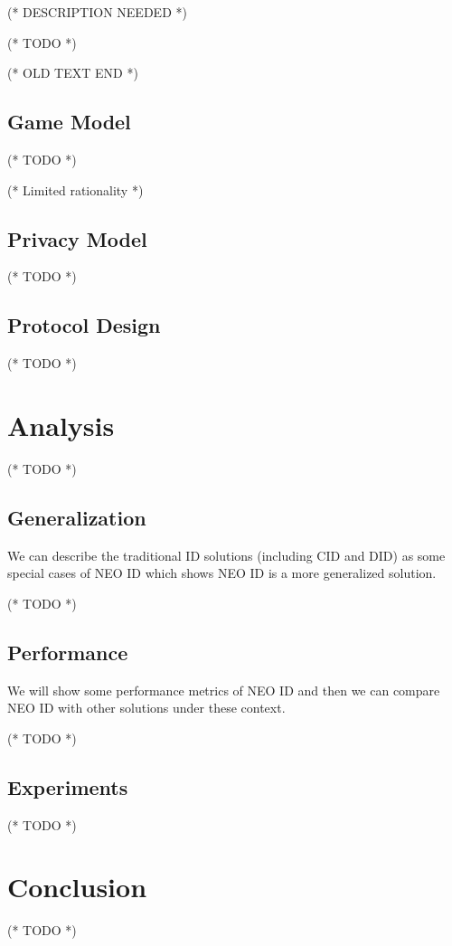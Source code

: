\documentclass{article}
\begin{document}



(* DESCRIPTION NEEDED *)



(* TODO *)



(* OLD TEXT END *)






\subsection{Game Model}



(* TODO *)



(* Limited rationality *)


\subsection{Privacy Model}



(* TODO *)


\subsection{Protocol Design}



(* TODO *)


\section{Analysis}



(* TODO *)


\subsection{Generalization}



We can describe the traditional ID solutions (including CID and DID) as some special cases of NEO ID which shows NEO ID is a more generalized solution.



(* TODO *)


\subsection{Performance}



We will show some performance metrics of NEO ID and then we can compare NEO ID with other solutions under these context.



(* TODO *)


\subsection{Experiments}



(* TODO *)


\section{Conclusion}



(* TODO *)
\end{document}
